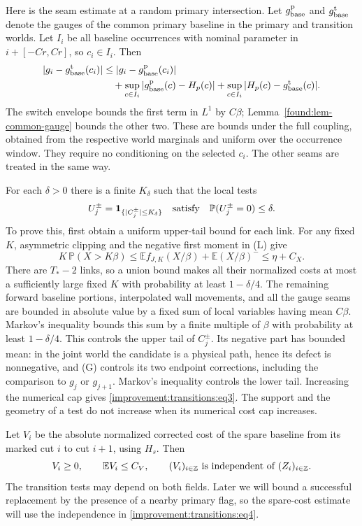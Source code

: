 Here is the seam estimate at a random primary intersection. Let
$g_{\rm base}^{\rm p}$ and $g_{\rm base}^{\rm t}$ denote the gauges
of the common primary baseline in the primary and transition worlds.
Let $I_i$ be all baseline occurrences with nominal parameter in
$i+[-Cr,Cr]$, so $c_i\in I_i$. Then
\[
\begin{split}
 |g_i-g_{\rm base}^{\rm t}(c_i)|
 &\le |g_i-g_{\rm base}^{\rm p}(c_i)|\\
 &\quad+\sup_{c\in I_i}|g_{\rm base}^{\rm p}(c)-H_p(c)|
       +\sup_{c\in I_i}|H_p(c)-g_{\rm base}^{\rm t}(c)|.
\end{split}
\]
The switch envelope bounds the first term in $L^1$ by $C\beta$;
Lemma~\ref{found:lem-common-gauge} bounds the other two. These are
bounds under the full coupling, obtained from the respective world
marginals and uniform over the occurrence window. They require no
conditioning on the selected $c_i$. The other seams are treated in
the same way.

For each $\delta>0$ there is a finite $K_\delta$ such that the local
tests
\begin{equation}
 U_j^\pm=\mathbf1_{\{|C_j^\pm|\leq K_\delta\}}
 \quad\hbox{satisfy}\quad
 \mathbb P(U_j^\pm=0)\leq\delta.
 \label{improvement:transitions:eq3}
\end{equation}
To prove this, first obtain a uniform upper-tail bound for each link.
For any fixed $K$, asymmetric clipping and the negative first moment in
(L) give
\[
 K\,\mathbb P(X>K\beta)
 \leq \mathbb Ef_{J,K}(X/\beta)
       +\mathbb E(X/\beta)^-
 \leq \eta+C_X.
\]
There are $T_*-2$ links, so a union bound makes all their normalized
costs at most a sufficiently large fixed $K$ with probability at least
$1-\delta/4$. The remaining forward baseline portions, interpolated
wall movements, and all the gauge seams are bounded in absolute value
by a fixed sum of local variables having mean $C\beta$. Markov's
inequality bounds this sum by a finite multiple of $\beta$ with
probability at least $1-\delta/4$. This controls the upper tail of
$C_j^\pm$. Its negative part has bounded mean: in the joint world the
candidate is a physical path, hence its defect is nonnegative, and
(G) controls its two endpoint corrections, including the comparison
to $g_j$ or $g_{j+1}$. Markov's inequality controls the lower tail.
Increasing the numerical cap gives \eqref{improvement:transitions:eq3}.
The support and the geometry of a test do not increase when its
numerical cost cap increases.

Let $V_i$ be the absolute normalized corrected cost of the spare
baseline from its marked cut $i$ to cut $i+1$, using $H_s$. Then
\begin{equation}
 V_i\geq0,\qquad \mathbb EV_i\leq C_V,
 \qquad (V_i)_{i\in\mathbb Z}\ \hbox{is independent of}
                  \ (Z_i)_{i\in\mathbb Z}.
 \label{improvement:transitions:eq4}
\end{equation}
The transition tests may depend on both fields. Later we will bound a
successful replacement by the presence of a nearby primary flag, so the
spare-cost estimate will use the independence in
\eqref{improvement:transitions:eq4}.

